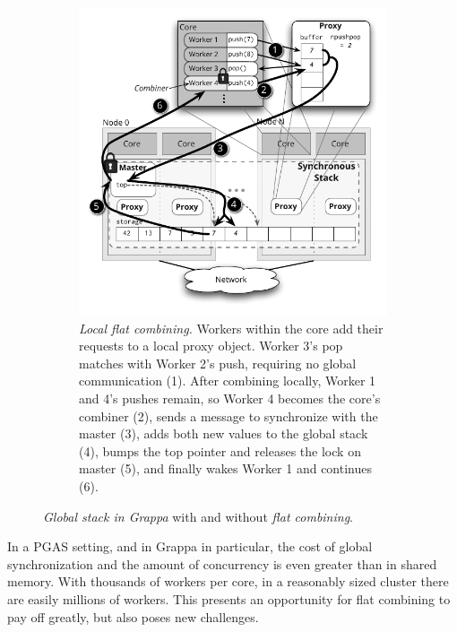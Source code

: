 \begin{figure}[t]
\begin{subfigure}[b]{0.43\textwidth}
    \includegraphics[width=\textwidth]{figs/stack_fc.pdf}
    \caption{\emph{Local flat combining.}
      Workers within the core add their requests to a local proxy object. Worker 3's pop matches with Worker 2's push, requiring no global communication (1). After combining locally, Worker 1 and 4's pushes remain, so Worker 4 becomes the core's combiner (2), sends a message to synchronize with the master (3), adds both new values to the global stack (4), bumps the top pointer and releases the lock on master (5), and finally wakes Worker 1 and continues (6).
    }
    \label{fig:stackfc}
  \end{subfigure}
  \caption{\emph{Global stack in Grappa} with and without \emph{flat combining}.}
  \label{fig:stack}
\end{figure}

In a PGAS setting, and in Grappa in particular, the cost of global synchronization and the amount of concurrency is even greater than in shared memory. With thousands of workers per core, in a reasonably sized cluster there are easily millions of workers. This presents an opportunity for flat combining to pay off greatly, but also poses new challenges.


